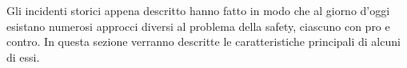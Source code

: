 Gli incidenti storici appena descritto hanno fatto in modo che al giorno d'oggi esistano numerosi approcci diversi al problema della safety, ciascuno con pro e contro. In questa sezione verranno descritte le caratteristiche principali di alcuni di essi. 